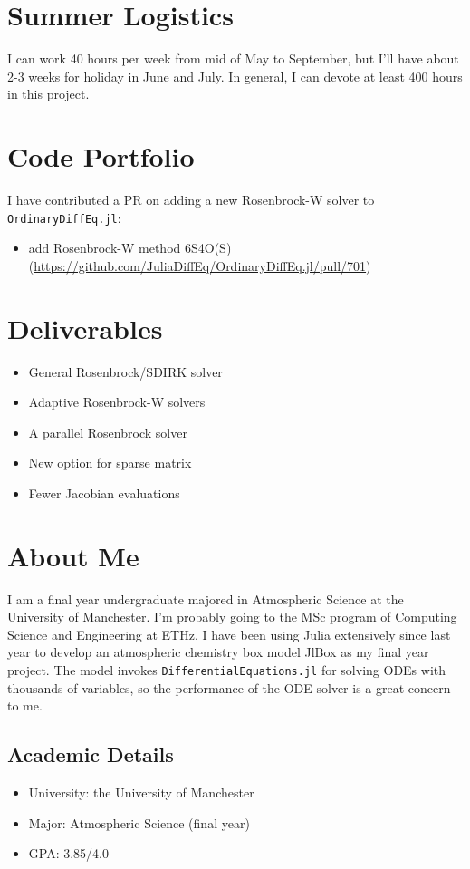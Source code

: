 \documentclass[a4paper]{article}
\begin{document}
\section{Summer Logistics}
\label{sec:orgd440ead}
I can work 40 hours per week from mid of May to September, but I'll have about
2-3 weeks for holiday in June and July. In general, I can devote at least 400
hours in this project.

\section{Code Portfolio}
\label{sec:orga67ee27}
I have contributed a PR on adding a new Rosenbrock-W solver to \texttt{OrdinaryDiffEq.jl}:
\begin{itemize}
\item add Rosenbrock-W method 6S4O(S) (\url{https://github.com/JuliaDiffEq/OrdinaryDiffEq.jl/pull/701})
\end{itemize}

\section{Deliverables}
\label{sec:orgd12e9c1}
\begin{itemize}
\item General Rosenbrock/SDIRK solver
\item Adaptive Rosenbrock-W solvers
\item A parallel Rosenbrock solver
\item New option for sparse matrix
\item Fewer Jacobian evaluations
\end{itemize}

\section{About Me}
\label{sec:org9503bdc}
I am a final year undergraduate majored in Atmospheric Science at the University
of Manchester. I'm probably going to the MSc program of Computing Science and
Engineering at ETHz. I have been using Julia extensively since last year to
develop an atmospheric chemistry box model JlBox as my final year project. The
model invokes \texttt{DifferentialEquations.jl} for solving ODEs with thousands of
variables, so the performance of the ODE solver is a great concern to me.

\subsection{Academic Details}
\label{sec:org239a036}
\begin{itemize}
\item University: the University of Manchester
\item Major: Atmospheric Science (final year)
\item GPA: 3.85/4.0
\end{itemize}
\end{document}
